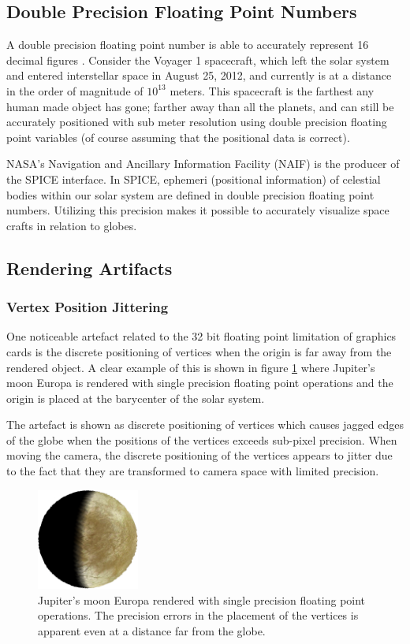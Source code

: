 \subsection{Double Precision Floating Point Numbers}

A double precision floating point number is able to accurately represent 16 decimal figures \cite{cozzi11}. Consider the Voyager 1 spacecraft, which left the solar system and entered interstellar space in August 25, 2012, and currently is at a distance in the order of magnitude of $10^{13}$ meters. This spacecraft is the farthest any human made object has gone; farther away than all the planets, and can still be accurately positioned with sub meter resolution using double precision floating point variables (of course assuming that the positional data is correct).

NASA's Navigation and Ancillary Information Facility (NAIF) is the producer of the SPICE interface. In SPICE, ephemeri (positional information) of celestial bodies within our solar system are defined in double precision floating point numbers. Utilizing this precision makes it possible to accurately visualize space crafts in relation to globes.

\subsection{Rendering Artifacts}
\subsubsection{Vertex Position Jittering}

One noticeable artefact related to the 32 bit floating point limitation of graphics cards is the discrete positioning of vertices when the origin is far away from the rendered object. A clear example of this is shown in figure \ref{fig:jittering} where Jupiter's moon Europa is rendered with single precision floating point operations and the origin is placed at the barycenter of the solar system.

The artefact is shown as discrete positioning of vertices which causes jagged edges of the globe when the positions of the vertices exceeds sub-pixel precision. When moving the camera, the discrete positioning of the vertices appears to jitter due to the fact that they are transformed to camera space with limited precision.

\begin{figure}[htbp]
    \centering
    \includegraphics[width=0.3\textwidth]{figures/europa.png}
    \caption{Jupiter's moon Europa rendered with single precision floating point operations. The precision errors in the placement of the vertices is apparent even at a distance far from the globe.}
    \label{fig:jittering}
\end{figure}

